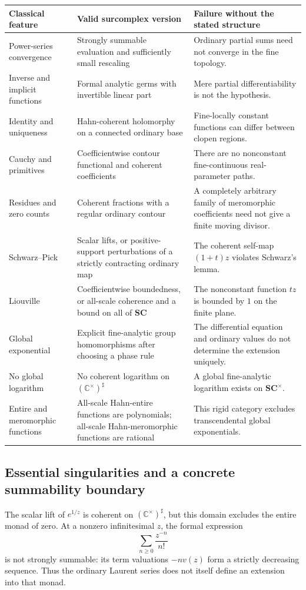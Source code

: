 \documentclass[11pt,letterpaper]{article}
\theoremstyle{definition}
\theoremstyle{remark}
\newcommand{\SC}{\mathbf{SC}}
\newcommand{\C}{\mathbb C}
\newcommand{\sh}{^{\sharp}}
\numberwithin{equation}{section}
\begin{document}
\begin{center}\small
\begin{longtable}{@{}L{0.22\textwidth}L{0.35\textwidth}L{0.33\textwidth}@{}}
\toprule
Classical feature & Valid surcomplex version & Failure without the stated structure\\
\midrule
\endhead
Power-series convergence & Strongly summable evaluation and sufficiently small rescaling & Ordinary partial sums need not converge in the fine topology.\\[0.4em]
Inverse and implicit functions & Formal analytic germs with invertible linear part & Mere partial differentiability is not the hypothesis.\\[0.4em]
Identity and uniqueness & Hahn-coherent holomorphy on a connected ordinary base & Fine-locally constant functions can differ between clopen regions.\\[0.4em]
Cauchy and primitives & Coefficientwise contour functional and coherent coefficients & There are no nonconstant fine-continuous real-parameter paths.\\[0.4em]
Residues and zero counts & Coherent fractions with a regular ordinary contour & A completely arbitrary family of meromorphic coefficients need not give a finite moving divisor.\\[0.4em]
Schwarz--Pick & Scalar lifts, or positive-support perturbations of a strictly contracting ordinary map & The coherent self-map $(1+t)z$ violates Schwarz's lemma.\\[0.4em]
Liouville & Coefficientwise boundedness, or all-scale coherence and a bound on all of $\SC$ & The nonconstant function $tz$ is bounded by $1$ on the finite plane.\\[0.4em]
Global exponential & Explicit fine-analytic group homomorphisms after choosing a phase rule & The differential equation and ordinary values do not determine the extension uniquely.\\[0.4em]
No global logarithm & No coherent logarithm on $(\C^\times)\sh$ & A global fine-analytic logarithm exists on $\SC^\times$.\\[0.4em]
Entire and meromorphic functions & All-scale Hahn-entire functions are polynomials; all-scale Hahn-meromorphic functions are rational & This rigid category excludes transcendental global exponentials.\\
\bottomrule
\end{longtable}
\end{center}

\subsection{Essential singularities and a concrete summability boundary}
The scalar lift of $e^{1/z}$ is coherent on $(\C^\times)\sh$, but this domain excludes the entire monad of zero. At a nonzero infinitesimal $z$, the formal expression
\[
 \sum_{n\ge0}\frac{z^{-n}}{n!}
\]
is not strongly summable: its term valuations $-n v(z)$ form a strictly decreasing sequence. Thus the ordinary Laurent series does not itself define an extension into that monad.
\end{document}
